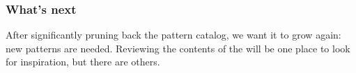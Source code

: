 \subsubsection*{What's next} After significantly pruning back the pattern catalog, we want it to grow again: new patterns are needed.  Reviewing the contents of the  will be one place to look for inspiration, but there are others.

